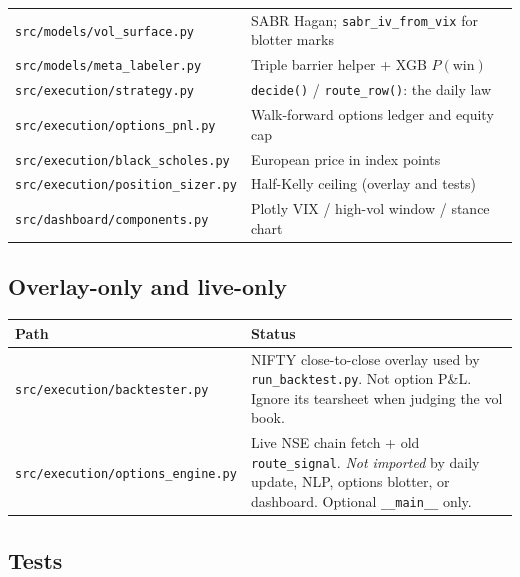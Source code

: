\documentclass[11pt,a4paper]{article}
\begin{document}
\begin{center}
\begin{tabular}{@{}p{}p{}@{}}
\texttt{src/models/vol\_surface.py} & SABR Hagan; \texttt{sabr\_iv\_from\_vix} for blotter marks \\
\texttt{src/models/meta\_labeler.py} & Triple barrier helper + XGB $P(\mathrm{win})$ \\
\texttt{src/execution/strategy.py} & \texttt{decide()} / \texttt{route\_row()}: the daily law \\
\texttt{src/execution/options\_pnl.py} & Walk-forward options ledger and equity cap \\
\texttt{src/execution/black\_scholes.py} & European price in index points \\
\texttt{src/execution/position\_sizer.py} & Half-Kelly ceiling (overlay and tests) \\
\texttt{src/dashboard/components.py} & Plotly VIX / high-vol window / stance chart \\
\bottomrule
\end{tabular}
\end{center}

\subsection{Overlay-only and live-only}

\begin{center}
\begin{tabular}{@{}p{}p{}@{}}
\toprule
Path & Status \\
\midrule
\texttt{src/execution/backtester.py} & NIFTY close-to-close overlay used by \texttt{run\_backtest.py}. Not option P\&L. Ignore its tearsheet when judging the vol book. \\
\texttt{src/execution/options\_engine.py} & Live NSE chain fetch + old \texttt{route\_signal}. \emph{Not imported} by daily update, NLP, options blotter, or dashboard. Optional \texttt{\_\_main\_\_} only. \\
\bottomrule
\end{tabular}
\end{center}

\subsection{Tests}
\end{document}
